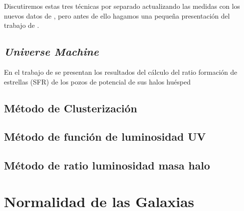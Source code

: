 Discutiremos estas tres técnicas por separado actualizando las medidas con los nuevos datos de \cite{behroozi2019universemachine}, pero antes de ello hagamos una pequeña presentación del trabajo de \cite{behroozi2019universemachine}.

\subsection{\textit{Universe Machine}}

En el trabajo de \cite{behroozi2019universemachine} se presentan los resultados del cálculo del ratio formación de estrellas (SFR) de los pozos de potencial de sus halos huésped

\subsection{Método de Clusterización}

\subsection{Método de función de luminosidad UV}

\subsection{Método de ratio luminosidad masa halo}

\section{Normalidad de las Galaxias}

